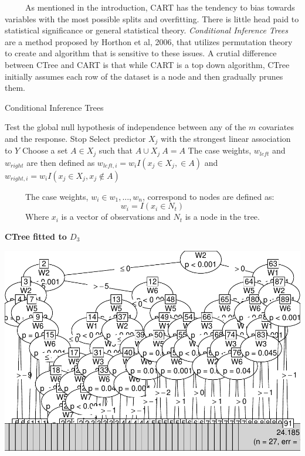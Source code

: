 \documentclass[12pt,twoside]{reedthesis}
\begin{document}
  ~~~~~As mentioned in the introduction, CART has the tendency to bias
  towards variables with the most possible splits and overfitting. There
  is little head paid to statistical significance or general statistical
  theory. \emph{Conditional Inference Trees} are a method proposed by
  Horthon et al, 2006, that utilizes permutation theory to create and
  algorithm that is sensitive to these issues. A crutial difference
  between CTree and CART is that while CART is a top down algorithm, CTree
  initially assumes each row of the dataset is a node and then gradually
  prunes them.
  
  \begin{algorithm}
  \caption{Conditional Inference Trees}
  \label{ctree}
  \begin{algorithmic}[1]
  \State Test the global null hypothesis of independence between any of the $m$ covariates and the response. 
  \State Stop 
  \Else \State Select predictor $X_j$ with the strongest linear association to $Y$ 
  \EndIf
  \State Choose a set $A \in X_j$ such that $A \cup X_j \ A = A$ 
  \State The case weights, $w_{left}$ and $w_{right}$ are then defined as $w_{left,i} = w_i I (x_j \in X_j, \in A)$ and $w_{right,i} = w_i I(x_j \in X_j, x_j \notin A)$
  \EndFor
  \end{algorithmic}
  \end{algorithm}
  
  ~~~~~The case weights, \(w_i \in {w_1,..., w_n}\), correspond to nodes
  are defined as:\[w_i = I(x_i \in {N_t})\] ~~~~~Where \(x_i\) is a vector
  of observations and \(N_t\) is a node in the tree.
  
  \textbf{CTree fitted to \(D_3\)}
  
  \begin{center}\includegraphics{Thesis_files/figure-latex/ctree-1} \end{center}
  
\end{document}
